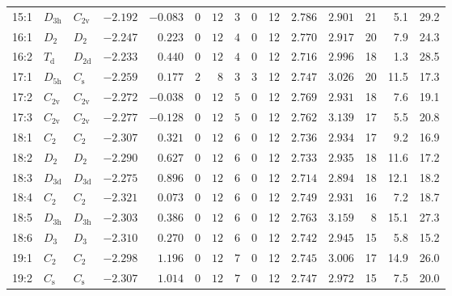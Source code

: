 \begin{table}[htbp]
{\begin{tabular}{lllrrrrrrrrrrrr}
15:1    & $D_\mathrm{3h}$ & $C_\mathrm{2v}$ & $-2.192$ & $-0.083$ & $0$ & $12$ & $3$      & $0$ & 12  & $2.786$ & $2.901$ & 21  & 5.1  & 29.2  \\
16:1    & $D_\mathrm{2}$  & $D_\mathrm{2 }$ & $-2.247$ & $0.223$  & $0$ & $12$ & $4$      & $0$ & 12  & $2.770$ & $2.917$ & 20  & 7.9  & 24.3  \\
16:2    & $T_\mathrm{d}$  & $D_\mathrm{2d}$ & $-2.233$ & $0.440$  & $0$ & $12$ & $4$      & $0$ & 12  & $2.716$ & $2.996$ & 18  & 1.3  & 28.5  \\
17:1    & $D_\mathrm{5h}$ & $C_\mathrm{s}$    & $-2.259$ & $0.177$  & $2$ & $8$  & $3$      & $3$ & 12  & $2.747$ & $3.026$ & 20  & 11.5 & 17.3  \\
17:2    & $C_\mathrm{2v}$ & $C_\mathrm{2v}$ & $-2.272$ & $-0.038$ & $0$ & $12$ & $5$      & $0$ & 12  & $2.769$ & $2.931$ & 18  & 7.6  & 19.1  \\
17:3    & $C_\mathrm{2v}$ & $C_\mathrm{2v}$ & $-2.277$ & $-0.128$ & $0$ & $12$ & $5$      & $0$ & 12  & $2.762$ & $3.139$ & 17  & 5.5  & 20.8  \\
18:1    & $C_\mathrm{2}$  & $C_\mathrm{2 }$ & $-2.307$ & $0.321$  & $0$ & $12$ & $6$      & $0$ & 12  & $2.736$ & $2.934$ & 17  & 9.2  & 16.9  \\
18:2    & $D_\mathrm{2}$  & $D_\mathrm{2 }$ & $-2.290$ & $0.627$  & $0$ & $12$ & $6$      & $0$ & 12  & $2.733$ & $2.935$ & 18  & 11.6 & 17.2  \\
18:3    & $D_\mathrm{3d}$ & $D_\mathrm{3d}$ & $-2.275$ & $0.896$  & $0$ & $12$ & $6$      & $0$ & 12  & $2.714$ & $2.894$ & 18  & 12.1 & 18.2  \\
18:4    & $C_\mathrm{2}$  & $C_\mathrm{2 }$ & $-2.321$ & $0.073$  & $0$ & $12$ & $6$      & $0$ & 12  & $2.749$ & $2.931$ & 16  & 7.2  & 18.7  \\
18:5    & $D_\mathrm{3h}$ & $D_\mathrm{3h}$ & $-2.303$ & $0.386$  & $0$ & $12$ & $6$      & $0$ & 12  & $2.763$ & $3.159$ & 8   & 15.1 & 27.3  \\
18:6    & $D_\mathrm{3}$  & $D_\mathrm{3 }$ & $-2.310$ & $0.270$  & $0$ & $12$ & $6$      & $0$ & 12  & $2.742$ & $2.945$ & 15  & 5.8  & 15.2  \\
19:1    & $C_\mathrm{2}$  & $C_\mathrm{2 }$ & $-2.298$ & $1.196$  & $0$ & $12$ & $7$      & $0$ & 12  & $2.745$ & $3.006$ & 17  & 14.9 & 26.0  \\
19:2    & $C_\mathrm{s}$  & $C_\mathrm{s }$ & $-2.307$ & $1.014$  & $0$ & $12$ & $7$      & $0$ & 12  & $2.747$ & $2.972$ & 15  & 7.5  & 20.0  \\

\end{tabular}}
\end{table}
